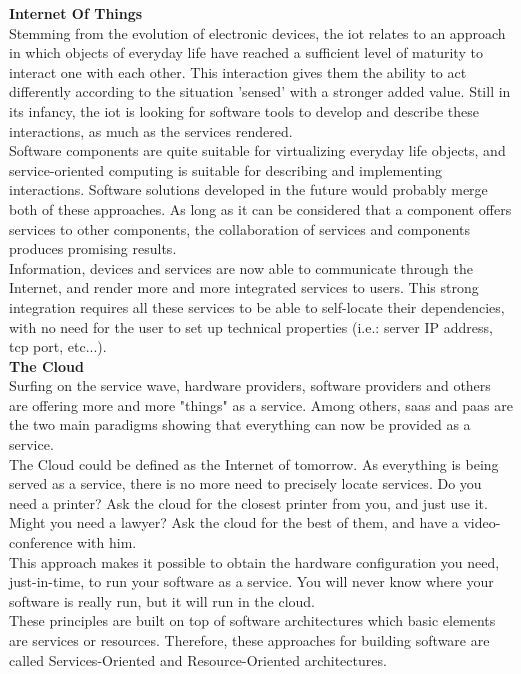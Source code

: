 {\bf Internet Of Things}\\
\label{subsec:iot}
Stemming from the evolution of electronic devices, the \gls{iot} relates to an approach in which objects of everyday life have reached a sufficient level of maturity to interact one with each other. This interaction gives them the ability to act differently according to the situation 'sensed' with a stronger added value. Still in its infancy, the \gls{iot} is looking for software tools to develop and describe these interactions, as much as the services rendered.\\
Software components are quite suitable for virtualizing everyday life objects, and service-oriented computing is suitable for describing and implementing interactions. Software solutions developed in the future would probably merge both of these approaches. As long as it can be considered that a component offers services to other components, the collaboration of services and components produces promising results.\\

Information, devices and services are now able to communicate through the Internet, and render more and more integrated services to users. This strong integration requires all these services to be able to self-locate their dependencies, with no need for the user to set up technical properties (i.e.: server IP address, tcp port, etc...).\\

{\bf The Cloud}\\
\label{subsec:cloud}
Surfing on the service wave, hardware providers, software providers and others are offering more and more "things" as a service. Among others, \gls{saas} and \gls{paas} are the two main paradigms showing that everything can now be provided as a service.\\
The Cloud could be defined as the Internet of tomorrow. As everything is being served as a service, there is no more need to precisely locate services. Do you need a printer? Ask the cloud for the closest printer from you, and just use it. Might you need a lawyer? Ask the cloud for the best of them, and have a video-conference with him.\\
This approach makes it possible to obtain the hardware configuration you need, just-in-time, to run your software as a service. You will never know where your software is really run, but it will run in the cloud.\\

These principles are built on top of software architectures which basic elements are services or resources. Therefore, these approaches for building software are called Services-Oriented and Resource-Oriented architectures.

